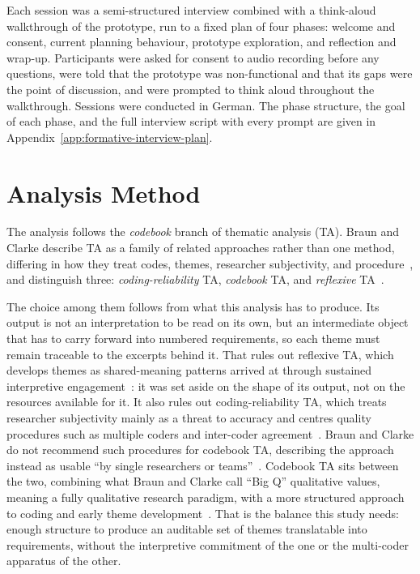 Each session was a semi-structured interview combined with a think-aloud walkthrough of the prototype, run to a fixed plan of four phases: welcome and consent, current planning behaviour, prototype exploration, and reflection and wrap-up. Participants were asked for consent to audio recording before any questions, were told that the prototype was non-functional and that its gaps were the point of discussion, and were prompted to think aloud throughout the walkthrough. Sessions were conducted in German. The phase structure, the goal of each phase, and the full interview script with every prompt are given in Appendix~\ref{app:formative-interview-plan}.

\section{Analysis Method}
\label{sec:analysis-method}

The analysis follows the \emph{codebook} branch of thematic analysis (TA). Braun and Clarke describe TA as a family of related approaches rather than one method, differing in how they treat codes, themes, researcher subjectivity, and procedure~\cite[pp.~227--232]{braun_thematic_2022}, and distinguish three: \emph{coding-reliability} TA, \emph{codebook} TA, and \emph{reflexive} TA~\cite[pp.~235--236]{braun_thematic_2022}.

The choice among them follows from what this analysis has to produce. Its output is not an interpretation to be read on its own, but an intermediate object that has to carry forward into numbered requirements, so each theme must remain traceable to the excerpts behind it. That rules out reflexive TA, which develops themes as shared-meaning patterns arrived at through sustained interpretive engagement~\cite[pp.~35--36, 77--78]{braun_thematic_2022}: it was set aside on the shape of its output, not on the resources available for it. It also rules out coding-reliability TA, which treats researcher subjectivity mainly as a threat to accuracy and centres quality procedures such as multiple coders and inter-coder agreement~\cite[pp.~237--238]{braun_thematic_2022}. Braun and Clarke do not recommend such procedures for codebook TA, describing the approach instead as usable \enquote{by single researchers or teams}~\cite[pp.~236, 248]{braun_thematic_2022}. Codebook TA sits between the two, combining what Braun and Clarke call \enquote{Big Q} qualitative values, meaning a fully qualitative research paradigm, with a more structured approach to coding and early theme development~\cite[p.~242]{braun_thematic_2022}. That is the balance this study needs: enough structure to produce an auditable set of themes translatable into requirements, without the interpretive commitment of the one or the multi-coder apparatus of the other.

